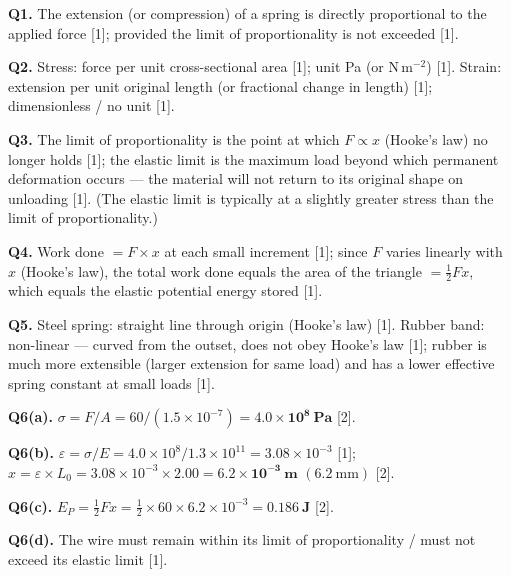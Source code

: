 \begin{markscheme}

\textbf{Q1.} The extension (or compression) of a spring is directly proportional to the applied force [1]; provided the limit of proportionality is not exceeded [1].

\vspace{0.5em}\textbf{Q2.} Stress: force per unit cross-sectional area [1]; unit Pa (or N\,m$^{-2}$) [1]. Strain: extension per unit original length (or fractional change in length) [1]; dimensionless / no unit [1].

\vspace{0.5em}\textbf{Q3.} The limit of proportionality is the point at which $F \propto x$ (Hooke's law) no longer holds [1]; the elastic limit is the maximum load beyond which permanent deformation occurs — the material will not return to its original shape on unloading [1]. (The elastic limit is typically at a slightly greater stress than the limit of proportionality.)

\vspace{0.5em}\textbf{Q4.} Work done $= F \times x$ at each small increment [1]; since $F$ varies linearly with $x$ (Hooke's law), the total work done equals the area of the triangle $= \tfrac{1}{2}Fx$, which equals the elastic potential energy stored [1].

\vspace{0.5em}\textbf{Q5.} Steel spring: straight line through origin (Hooke's law) [1]. Rubber band: non-linear — curved from the outset, does not obey Hooke's law [1]; rubber is much more extensible (larger extension for same load) and has a lower effective spring constant at small loads [1].

\vspace{0.5em}\textbf{Q6(a).} $\sigma = F/A = 60 / (1.5\times10^{-7}) = \mathbf{4.0\times10^8\ \text{Pa}}$ [2].

\vspace{0.5em}\textbf{Q6(b).} $\varepsilon = \sigma/E = 4.0\times10^8 / 1.3\times10^{11} = 3.08\times10^{-3}$ [1]; $x = \varepsilon \times L_0 = 3.08\times10^{-3} \times 2.00 = \mathbf{6.2\times10^{-3}\ \text{m}}$ $(6.2\ \text{mm})$ [2].

\vspace{0.5em}\textbf{Q6(c).} $E_P = \tfrac{1}{2}Fx = \tfrac{1}{2} \times 60 \times 6.2\times10^{-3} = \mathbf{0.186\ \text{J}}$ [2].

\vspace{0.5em}\textbf{Q6(d).} The wire must remain within its limit of proportionality / must not exceed its elastic limit [1].


\end{markscheme}
